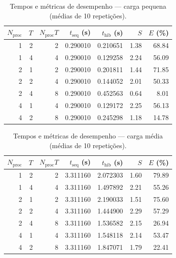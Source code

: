 \documentclass[11pt,a4paper]{article}
\begin{document}
\begin{table}[H]
\centering\small
\caption{Tempos e métricas de desempenho --- carga pequena (médias de 10 repetições).}
\label{tab:res-pequena}
\begin{tabular}{rrrrrrr}
\toprule
$N_{\mathrm{proc}}$ & $T$ & $N_{\mathrm{proc}}T$ & $t_{\mathrm{seq}}$ (s) & $t_{\mathrm{hib}}$ (s) & $S$ & $E$ (\%) \\
\midrule
1 & 2 & 2 & 0.290010 & 0.210651 & 1.38 & 68.84 \\
1 & 4 & 4 & 0.290010 & 0.129258 & 2.24 & 56.09 \\
\midrule
2 & 1 & 2 & 0.290010 & 0.201811 & 1.44 & 71.85 \\
2 & 2 & 4 & 0.290010 & 0.144052 & 2.01 & 50.33 \\
2 & 4 & 8 & 0.290010 & 0.452563 & 0.64 & 8.01 \\
\midrule
4 & 1 & 4 & 0.290010 & 0.129172 & 2.25 & 56.13 \\
4 & 2 & 8 & 0.290010 & 0.245298 & 1.18 & 14.78 \\
\bottomrule
\end{tabular}
\end{table}

\begin{table}[H]
\centering\small
\caption{Tempos e métricas de desempenho --- carga média (médias de 10 repetições).}
\label{tab:res-media}
\begin{tabular}{rrrrrrr}
\toprule
$N_{\mathrm{proc}}$ & $T$ & $N_{\mathrm{proc}}T$ & $t_{\mathrm{seq}}$ (s) & $t_{\mathrm{hib}}$ (s) & $S$ & $E$ (\%) \\
\midrule
1 & 2 & 2 & 3.311160 & 2.072303 & 1.60 & 79.89 \\
1 & 4 & 4 & 3.311160 & 1.497892 & 2.21 & 55.26 \\
\midrule
2 & 1 & 2 & 3.311160 & 2.190033 & 1.51 & 75.60 \\
2 & 2 & 4 & 3.311160 & 1.444900 & 2.29 & 57.29 \\
2 & 4 & 8 & 3.311160 & 1.536582 & 2.15 & 26.94 \\
\midrule
4 & 1 & 4 & 3.311160 & 1.548118 & 2.14 & 53.47 \\
4 & 2 & 8 & 3.311160 & 1.847071 & 1.79 & 22.41 \\
\bottomrule
\end{tabular}
\end{table}
\end{document}
